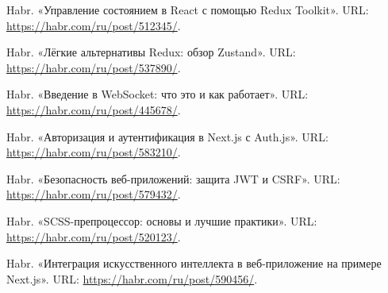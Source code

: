 \begin{thebibliography}{99}
    Habr. «Управление состоянием в React с помощью Redux Toolkit». URL: \url{https://habr.com/ru/post/512345/}.

    Habr. «Лёгкие альтернативы Redux: обзор Zustand». URL: \url{https://habr.com/ru/post/537890/}.

    Habr. «Введение в WebSocket: что это и как работает». URL: \url{https://habr.com/ru/post/445678/}.

    Habr. «Авторизация и аутентификация в Next.js с Auth.js». URL: \url{https://habr.com/ru/post/583210/}.

    Habr. «Безопасность веб-приложений: защита JWT и CSRF». URL: \url{https://habr.com/ru/post/579432/}.

    Habr. «SCSS-препроцессор: основы и лучшие практики». URL: \url{https://habr.com/ru/post/520123/}.

    Habr. «Интеграция искусственного интеллекта в веб-приложение на примере Next.js». URL: \url{https://habr.com/ru/post/590456/}.

  \end{thebibliography}
\endgroup
